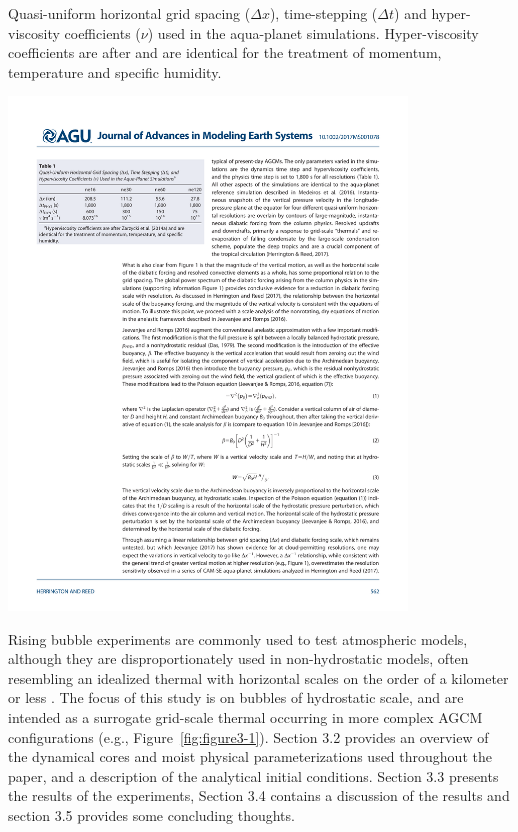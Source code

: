 \begin{table}
\caption{Quasi-uniform horizontal grid spacing ($\Delta x$), time-stepping ($\Delta t$) and hyper-viscosity coefficients ($\nu$) used in the aqua-planet simulations. Hyper-viscosity coefficients are after \cite{ZetAl2014JC} and are identical for the treatment of momentum, temperature and specific humidity.}
\begin{center}
\noindent\includegraphics[width=25pc,angle=0]{chapter3/table1.pdf}\\
\end{center}
\label{tbl:table3-1}
\end{table}

Rising bubble experiments are commonly used to test atmospheric models, although they are disproportionately used in non-hydrostatic models, often resembling an idealized thermal with horizontal scales on the order of a kilometer or less \citep{KW_1978JAS,GETAL1991JAS,BETAL2002MWR,JR2016QJRMS}. The focus of this study is on bubbles of hydrostatic scale, and are intended as a surrogate grid-scale thermal occurring in more complex AGCM configurations (e.g., Figure~\ref{fig:figure3-1}). Section 3.2 provides an overview of the dynamical cores and moist physical parameterizations used throughout the paper, and a description of the analytical initial conditions. Section 3.3 presents the results of the experiments, Section 3.4 contains a discussion of the results and section 3.5 provides some concluding thoughts.

